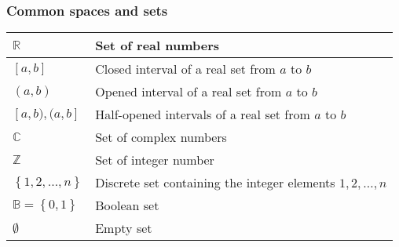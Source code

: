 \documentclass{article}
\begin{document}
\subsubsection{Common spaces and sets}
\begin{xltabular}{\textwidth}{XX}
	\(\mathbb{R}\)                                             & Set of real numbers                                                                                                                                \\ \hline
	\([a, b]\)                                                 & Closed interval of a real set from \(a\) to \(b\)                                                                                                  \\ \hline
	\((a, b)\)                                                 & Opened interval of a real set from \(a\) to \(b\)                                                                                                  \\ \hline
	\([a, b), (a, b]\)                                         & Half-opened intervals of a real set from \(a\) to \(b\)                                                                                            \\ \hline
	\(\mathbb{C}\)                                             & Set of complex numbers                                                                                                                             \\ \hline
	\(\mathbb{Z}\)                                             & Set of integer number                                                                                                                              \\ \hline
	\(\left\{ 1,2, \dots, n \right\}\)                         & Discrete set containing the integer elements \(1,2, \dots, n\)                                                                                     \\ \hline
	\(\mathbb{B} = \left\{ 0, 1 \right\}\)                     & Boolean set                                                                                                                                        \\ \hline %
	\(\emptyset\)                                              & Empty set                                                                                                                                          \\ \hline

\end{xltabular}
\end{document}
